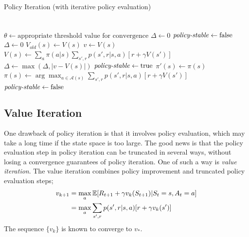 \documentclass[../../main.tex]{subfiles}
\begin{document}
        {Policy Iteration (with iterative policy evaluation)}
        { \\
         \\
        }
        {\\
        }
        {
            $\theta \leftarrow \text{appropriate threshold value for convergence}$\;
            $\Delta \leftarrow 0$\;
            $\text{\emph{policy-stable}} \leftarrow \text{false}$\;
            {
                \Repeat{$\Delta < \theta$}
                {
                $\Delta \leftarrow 0$\;
                $V_{old}(s) \leftarrow V(s)$\;
                {
                    $v \leftarrow V(s)$\;
                    $V(s) \leftarrow \sum_{a}\pi(a|s)\sum_{s',r}p(s',r|s,a)[r + \gamma V(s')]$\;
                    $\Delta \leftarrow \max(\Delta, |v-V(s)|)$\;
                }
                }
                $\text{\emph{policy-stable}} \leftarrow \text{true}$\;
                {
                    $\pi'(s) \leftarrow \pi(s)$\;
                    $\pi(s) \leftarrow \arg\max_{a \in \mathcal{A}(s)} \sum_{s',r}p(s',r|s,a)[r + \gamma V(s')]$\;
                    {
                        $\text{\emph{policy-stable}} \leftarrow \text{false}$\;
                    }
                }
            }
        }

    \subsection{Value Iteration}
        One drawback of policy iteration is that it involves policy evaluation, which may take a long time if the state space is too large.
        The good news is that the policy evaluation step in policy iteration can be truncated in several ways,
        without losing a convergence guarantees of policy iteration. One of such a way is \emph{value iteration}.
        The value iteration combines policy improvement and truncated policy evaluation steps;
        \begin{align}
            v_{k+1} &= \max_{a}\mathbb{E}[R_{t+1} + \gamma v_k(S_{t+1})|S_t=s,A_t=a] \\
            &=\max_{a}\sum_{s',r}p(s',r|s,a)[r+ \gamma v_k(s')]
        \end{align}
        The sequence $\{v_k\}$ is known to converge to $v_*$.
        
\end{document}
